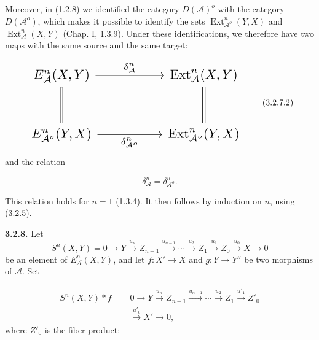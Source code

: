 \clearpage
{}%
\begingroup\small\setlength{\parskip}{0pt}\setlength{\emergencystretch}{1.5em}
\setlength{\abovedisplayskip}{4pt plus 2pt minus 2pt}%
\setlength{\belowdisplayskip}{4pt plus 2pt minus 2pt}%

Moreover, in (1.2.8) we identified the category $D(\mathcal A)^o$ with
the category $D(\mathcal A^o)$, which makes it possible to identify the
sets $\operatorname{Ext}_{\mathcal A^o}^{n}(Y,X)$ and
$\operatorname{Ext}_{\mathcal A}^{n}(X,Y)$ (Chap. I, 1.3.9). Under these
identifications, we therefore have two maps with the same source and the
same target:

\begin{equation}
\resizebox{0.74\textwidth}{!}{%
$\begin{tikzcd}[ampersand replacement=\&,column sep=5.0em,row sep=2.8em]
E_{\mathcal A}^{n}(X,Y)
  \arrow[r,"{\delta_{\mathcal A}^{n}}"]
  \arrow[d,equal]
\& \operatorname{Ext}_{\mathcal A}^{n}(X,Y)
  \arrow[d,equal] \\
E_{\mathcal A^o}^{n}(Y,X)
  \arrow[r,"{\delta_{\mathcal A^o}^{n}}"']
\& \operatorname{Ext}_{\mathcal A^o}^{n}(Y,X)
\end{tikzcd}$%
}
\tag{3.2.7.2}
\end{equation}
and the relation

\begin{equation}
\delta_{\mathcal A}^{n}=\delta_{\mathcal A^o}^{n}.
\tag{3.2.7.3}
\end{equation}

This relation holds for $n=1$ (1.3.4). It then follows by induction on $n$,
using (3.2.5).

\medskip\noindent\textbf{3.2.8.}\quad
Let
\[
S^n(X,Y)=0\longrightarrow Y\xrightarrow{u_n}Z_{n-1}
\xrightarrow{u_{n-1}}\cdots\xrightarrow{u_2}Z_1
\xrightarrow{u_1}Z_0\xrightarrow{u_0}X\longrightarrow0
\]
be an element of $E_{\mathcal A}^{n}(X,Y)$, and let
$f\colon X'\longrightarrow X$ and $g\colon Y\longrightarrow Y''$ be two
morphisms of $\mathcal A$. Set

\begin{equation}
\begin{aligned}
S^n(X,Y)*f={}&0\longrightarrow Y\xrightarrow{u_n}Z_{n-1}
\xrightarrow{u_{n-1}}\cdots\xrightarrow{u_2}Z_1
\xrightarrow{u'_1}Z'_0\\
&\xrightarrow{u'_0}X'\longrightarrow0,
\end{aligned}
\tag{3.2.8.1}
\end{equation}
where $Z'_0$ is the fiber product:

